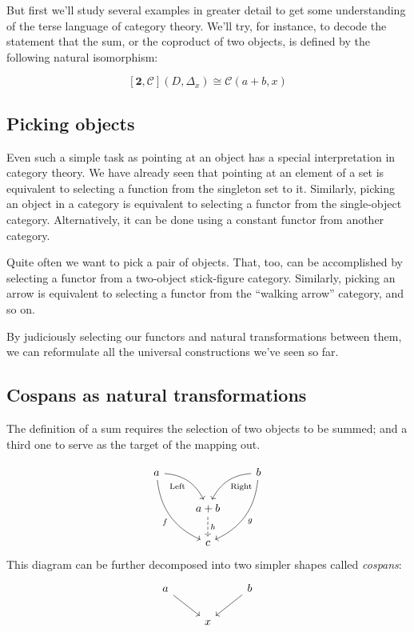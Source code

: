 \documentclass[DaoFP]{subfiles}
\begin{document}
But first we'll study several examples in greater detail to get some understanding of the terse language of category theory. We'll try, for instance, to decode the statement that the sum, or the coproduct of two objects, is defined by the following natural isomorphism:

\[ [\mathbf{2}, \mathcal{C}](D, \Delta_x)  \cong \mathcal{C}(a + b, x) \]



\subsection{Picking objects}

Even such a simple task as pointing at an object has a special interpretation in category theory. We have already seen that pointing at an element of a set is equivalent to selecting a function from the singleton set to it. Similarly, picking an object in a category is equivalent to selecting a functor from the single-object category. Alternatively, it can be done using a constant functor from another category. 

Quite often we want to pick a pair of objects. That, too, can be accomplished by selecting a functor from a two-object stick-figure category. Similarly, picking an arrow is equivalent to selecting a functor from the ``walking arrow'' category, and so on.

By judiciously selecting our functors and natural transformations between them, we can reformulate all the universal constructions we've seen so far.

\subsection{Cospans as natural transformations}

The definition of a sum requires the selection of two objects to be summed; and a third one to serve as the target of the mapping out.

\[
 \begin{tikzcd}
 a
 \arrow[dr,  bend left, "\text{Left}"']
 \arrow[ddr, bend right, "f"']
 && b
 \arrow[dl, bend right, "\text{Right}"]
 \arrow[ddl, bend left, "g"]
 \\
&a + b
\arrow[d, dashed, "h"]
\\
& c
 \end{tikzcd}
\]
This diagram can be further decomposed into two simpler shapes called \emph{cospans}:
\[
 \begin{tikzcd}
 a
 \arrow[dr, ""']
 && b
 \arrow[dl, ""]
 \\
 & x
 \end{tikzcd}
\]
\end{document}
